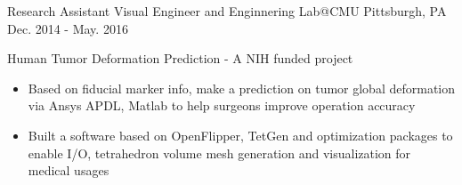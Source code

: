 \begin{cventries}
  \cventry
    {Research Assistant} %
    {Visual Engineer and Enginnering Lab@CMU} %
    {Pittsburgh, PA} %
    {Dec. 2014 - May. 2016} %
    {
      \begin{cvitems} %
        \item {Human Tumor Deformation Prediction - A NIH funded project}
        \begin{itemize}
          \item {Based on fiducial marker info, make a prediction on tumor global deformation via Ansys APDL, Matlab to help surgeons improve operation accuracy}
          \item {Built a software based on OpenFlipper, TetGen and optimization packages to enable I/O, tetrahedron volume mesh generation and visualization for medical usages}
        \end{itemize}
      \end{cvitems}
    }

\end{cventries}
